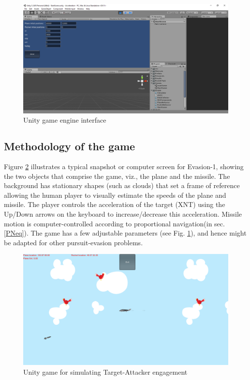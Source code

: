 \begin{figure}[H]
	\centering
	\includegraphics[scale = 0.30]{fig/unityInterface.PNG}
	\caption{Unity game engine interface }
	\label{UnityInterface}
\end{figure}


\subsection{Methodology of the game}

Figure \ref{UnityGame} illustrates a typical snapshot or computer screen for Evasion-1, showing the two objects that comprise the game, viz., the plane and the missile. The background has stationary shapes (such as clouds) that set a frame of reference allowing the human player to visually estimate the speeds of the plane and missile. The player controls the acceleration of the target (XNT) using the Up/Down arrows on the keyboard to increase/decrease this acceleration.   Missile motion is computer-controlled according to proportional navigation(in sec. \ref{PNeq}). The game has a few adjustable parameters (see Fig. \ref{UnityInterface}), and hence might be adapted for other pursuit-evasion problems.

 \begin{figure}[H]
 	\centering
 	\includegraphics[scale = 0.32]{fig/unityGame.PNG}
 	\caption{Unity game for simulating Target-Attacker engagement}
 	\label{UnityGame}
 \end{figure}
 

